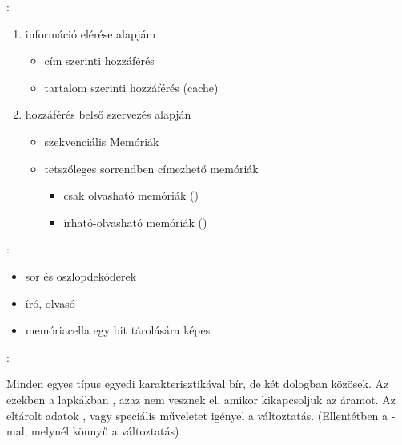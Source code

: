 \documentclass[main.tex]{subfiles}
\begin{document}
  {\large {}:}
  \begin{enumerate}
    \item információ elérése alapjám
    \begin{itemize}
      \item cím szerinti hozzáférés
      
      \item tartalom szerinti hozzáférés (cache)
    \end{itemize}

    \item hozzáférés belső szervezés alapján
    \begin{itemize}
      \item szekvenciális Memóriák
      
      \item tetszőleges sorrendben címezhető memóriák
      \begin{itemize}
        \item csak olvasható memóriák ()
        
        \item írható-olvasható memóriák ()
      \end{itemize}
    \end{itemize}
  \end{enumerate}

  {\large {}:}
  \begin{itemize}
    \item sor és oszlopdekóderek
    \item író, olvasó
    \item memóriacella egy bit tárolására képes
  \end{itemize}

  {\large {}:}

  Minden egyes típus egyedi karakterisztikával bír,
  de két dologban közösek. Az 
  ezekben a lapkákban , azaz nem
  vesznek el, amikor kikapcsoljuk az áramot.
  Az eltárolt adatok ,
  vagy speciális műveletet igényel a változtatás.
  (Ellentétben a -mal, melynél könnyű a változtatás)
\end{document}
